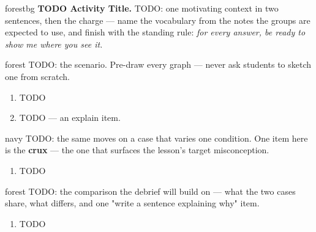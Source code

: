 \documentclass[10pt]{article}
\begin{document}

\vspace{0.08in}

\begin{headlinebox}{forestbg}
\small\textbf{TODO Activity Title.} TODO: one motivating context in two sentences, then the charge
--- name the vocabulary from the notes the groups are expected to use, and finish with the standing
rule: \emph{for every answer, be ready to show me where you see it.}
\end{headlinebox}

\vspace{0.06in}

\begin{scenariobox}{forest}
TODO: the scenario. Pre-draw every graph --- never ask students to sketch one from scratch.
\begin{enumerate}[label=\textbf{\alph*.}, leftmargin=1.8em, itemsep=5pt]
  \item TODO \blank{2.0cm}
  \item TODO --- an explain item.
\end{enumerate}
\end{scenariobox}

\boxguard[22]
\begin{scenariobox}{navy}
TODO: the same moves on a case that varies one condition. One item here is the \textbf{crux} ---
the one that surfaces the lesson's target misconception.
\begin{enumerate}[label=\textbf{\alph*.}, leftmargin=1.8em, itemsep=5pt]
  \item TODO \blank{2.0cm}
\end{enumerate}
\end{scenariobox}

\boxguard[16]
\begin{scenariobox}{forest}
TODO: the comparison the debrief will build on --- what the two cases share, what differs, and one
"write a sentence explaining why" item.
\begin{enumerate}[label=\textbf{\alph*.}, leftmargin=1.8em, itemsep=5pt]
  \item TODO 
\end{enumerate}
\end{scenariobox}
\end{document}

